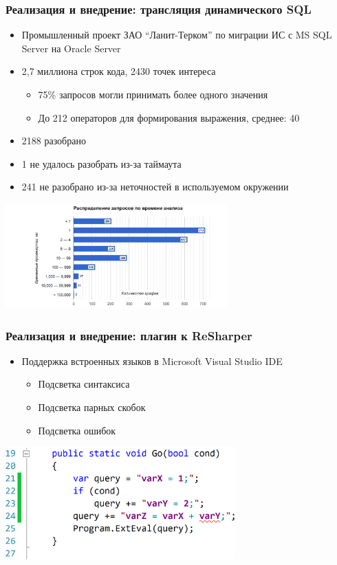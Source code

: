 \documentclass{beamer}
\begin{document}
\begin{frame}[t]
    \transwipe[direction=90]
    \frametitle{Реализация и внедрение: трансляция динамического SQL}
    \begin{itemize}
    \item Промышленный проект ЗАО ``Ланит-Терком'' по миграции ИС с MS SQL Server на Oracle Server
    \item 2,7 миллиона строк кода, 2430 точек интереса
        \begin{itemize}
            \item 75\% запросов могли принимать более одного значения
            \item До 212 операторов для формирования выражения, среднее: 40  
        \end{itemize}
    \item 2188 разобрано
    \item 1 не удалось разобрать из-за таймаута
    \item 241 не разобрано из-за неточностей в используемом окружении
  \end{itemize}
  \includegraphics[width=8.5cm]{pictures/dist.png}
\end{frame}

\begin{frame}[t]
    \transwipe[direction=90]
    \frametitle{Реализация и внедрение: плагин к ReSharper}
        \begin{itemize}
            \item Поддержка встроенных языков в Microsoft Visual Studio IDE
            \begin{itemize}
                \item Подсветка синтаксиса
                \item Подсветка парных скобок
                \item Подсветка ошибок
            \end{itemize}
        \end{itemize}
    \begin{center}
      \includegraphics[width=250pt]{pictures/RShExampe.png}
    \end{center}
\end{frame}
\end{document}
